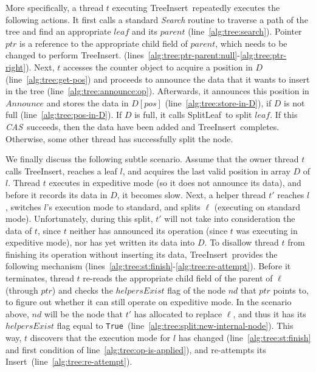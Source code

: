 \documentclass[a4paper,11pt,twoside,openany]{book}
\newcommand{\CAS}{\mbox{\textit{CAS}}}
\newcommand{\True}{\mbox{\texttt{True}}}
\newcommand{\Insert}{\mbox{\sc Insert}}
\newcommand{\TreeInsert}{\mbox{\sc TreeInsert}}
\newcommand{\SplitLeaf}{\mbox{\sc SplitLeaf}}
\begin{document}
    More specifically, a thread $t$ executing \TreeInsert\ repeatedly executes the following actions. 
    It first calls a standard \textit{Search} routine to traverse a path of the tree and find an appropriate
    $\mathit{leaf}$ and its $\mathit{parent}$ (line~\ref{alg:tree:search}).
    Pointer $\mathit{ptr}$ is a reference to the appropriate child field of $\mathit{parent}$,
    which needs to be changed to perform \TreeInsert.  (lines~\ref{alg:tree:ptr-parent:null}-\ref{alg:tree:ptr-right}).
    Next, $t$ accesses the counter object to acquire a position in $D$ (line~\ref{alg:tree:get-pos})
    and proceeds to announce the data that it wants to insert in the tree (line~\ref{alg:tree:announce:op}).
    Afterwards, it announces this position in $\mathit{Announce}$ and stores the data in $D[\mathit{pos}]$
    (line~\ref{alg:tree:store-in-D}), if $D$ is not full (line~\ref{alg:tree:pos-in-D}). 
    If $D$ is full, it calls \SplitLeaf\ to split $\mathit{leaf}$.
    If this \CAS\ succeeds, then the data have been added and \TreeInsert\ completes. 
    Otherwise, some other thread has successfully split the node.
    
    We finally discuss the following subtle scenario. Assume that the owner thread $t$ calls \TreeInsert,
    reaches a leaf $\mathit{l}$, and acquires the last valid position in array $D$ of $\mathit{l}$. 
    Thread $t$ executes in expeditive mode (so it does not announce its data),
    and before it records its data in $D$, it becomes slow. Next, a helper thread $t'$ reaches $\mathit{l}$, switches 
    $\mathit{l}$'s execution mode to standard, and splits $\ell$ (executing on standard mode). 
    Unfortunately, during this split, $t'$ will not take into 
    consideration the data of $t$, since $t$ neither has announced its operation
    (since $t$ was executing in expeditive mode), nor has yet written its data into $D$. 
    To disallow thread $t$ from finishing its operation without inserting its data, \TreeInsert\ provides the 
    following mechanism (lines~\ref{alg:tree:st:finish}-\ref{alg:tree:re-attempt}). Before it terminates, 
    thread $t$ re-reads the appropriate child field of the parent of $\ell$ (through $\mathit{ptr}$) 
    and checks the $\mathit{helpersExist}$ flag of the node $nd$ that $\mathit{ptr}$ points to,
    to figure out whether it can still operate on expeditive mode. In the scenario above, 
    $nd$ will be the node that $t'$ has allocated to replace $\ell$, and thus it has its 
    $\mathit{helpersExist}$ flag equal to \True\ (line~\ref{alg:tree:split:new-internal-node}). 
    This way, $t$ discovers that the execution mode for $\mathit{l}$ has changed
    (line~\ref{alg:tree:st:finish} and first condition of line~\ref{alg:tree:op-is-applied}),
    and re-attempts its \Insert\ (line~\ref{alg:tree:re-attempt}).
        
\end{document}
